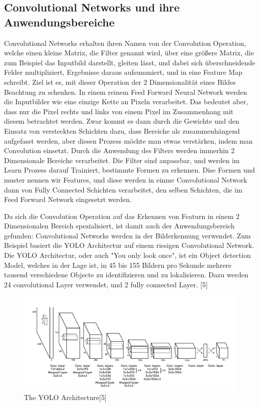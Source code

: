 \documentclass[12pt]{article}
\begin{document}
\subsection{Convolutional Networks und ihre Anwendungsbereiche}
Convolutional Networks erhalten ihren Namen von der Convolution Operation, welche einen kleine Matrix, die Filter genannt wird, über eine größere Matrix, die zum Beispiel das Inputbild darstellt, gleiten lässt, und dabei sich überschneidende Felder multipliziert, Ergebnisse daraus aufsummiert, und in eine Feature Map schreibt. Ziel ist es, mit dieser Operation der 2 Dimensionalität eines Bildes Beachtung zu schenken. In einem reinem Feed Forward Neural Network werden die Inputbilder wie eine einzige Kette an Pixeln verarbeitet. Das bedeutet aber, dass nur die Pixel rechts und links von einem Pixel im Zusammenhang mit diesem betrachtet werden. Zwar kommt es dann durch die Gewichte und den Einsatz von versteckten Schichten dazu, dass Bereiche als zusammenhängend aufgefasst werden, aber diesen Prozess möchte man etwas verstärken, indem man Convolution einsetzt. Durch die Anwendung des Filters werden immerhin 2 Dimensionale Bereiche verarbeitet. Die Filter sind anpassbar, und werden im Learn Prozess darauf Trainiert, bestimmte Formen zu erkennen. Dise Formen und muster nennen wir Features, und diese werden in einme Convolutional Network dann von Fully Connected Schichten verarbeitet, den selben Schichten, die im Feed Forward Network eingesetzt werden. 

Da sich die Convolution Operation auf das Erkennen von Featurn in einem 2 Dimensionalen Bereich spezialisiert, ist damit auch der Anwendungsbereich gefunden: Convolutional Networks werden in der Bilderkennung verwendet.
Zum Beispiel basiert die YOLO Architectur auf einem riesigen Convolutional Network. Die YOLO Architectur, oder auch "You only look once", ist ein Object detection Model, welches in der Lage ist, in 45 bis 155 Bildern pro Sekunde mehrere tausend verschiedene Objecte zu identifizieren und zu lokalisieren. Dazu werden 24 convolutional Layer verwendet, und 2 fully connected Layer. [5]

\begin{figure}[H]
\centering
\includegraphics[scale=0.38]{Images/007_YOLO.png}
\caption{The YOLO Architecture[5]}
\label{The YOLO Architecture[5]}
\end{figure}
\end{document}

